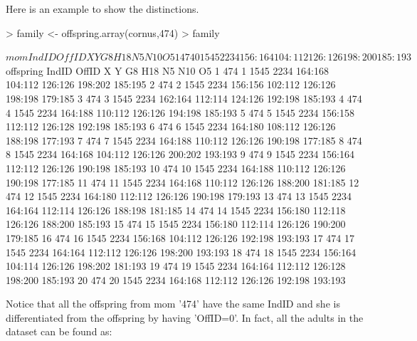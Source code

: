 \documentclass[letterpaper,twoside,openany]{book}
\begin{document}
Here is an example to show the distinctions. 

\begin{Schunk}
\begin{Sinput}
> family <- offspring.array(cornus,474)
> family
\end{Sinput}
\begin{Soutput}
$mom
  IndID OffID    X    Y      G8     H18      N5     N10      O5
1   474     0 1545 2234 156:164 104:112 126:126 198:200 185:193

$offspring
   IndID OffID    X    Y      G8     H18      N5     N10      O5
1    474     1 1545 2234 164:168 104:112 126:126 198:202 185:195
2    474     2 1545 2234 156:156 102:112 126:126 198:198 179:185
3    474     3 1545 2234 162:164 112:114 124:126 192:198 185:193
4    474     4 1545 2234 164:188 110:112 126:126 194:198 185:193
5    474     5 1545 2234 156:158 112:112 126:128 192:198 185:193
6    474     6 1545 2234 164:180 108:112 126:126 188:198 177:193
7    474     7 1545 2234 164:188 110:112 126:126 190:198 177:185
8    474     8 1545 2234 164:168 104:112 126:126 200:202 193:193
9    474     9 1545 2234 156:164 112:112 126:126 190:198 185:193
10   474    10 1545 2234 164:188 110:112 126:126 190:198 177:185
11   474    11 1545 2234 164:168 110:112 126:126 188:200 181:185
12   474    12 1545 2234 164:180 112:112 126:126 190:198 179:193
13   474    13 1545 2234 164:164 112:114 126:126 188:198 181:185
14   474    14 1545 2234 156:180 112:118 126:126 188:200 185:193
15   474    15 1545 2234 156:180 112:114 126:126 190:200 179:185
16   474    16 1545 2234 156:168 104:112 126:126 192:198 193:193
17   474    17 1545 2234 164:164 112:112 126:126 198:200 193:193
18   474    18 1545 2234 156:164 104:114 126:126 198:202 181:193
19   474    19 1545 2234 164:164 112:112 126:128 198:200 185:193
20   474    20 1545 2234 164:168 112:112 126:126 192:198 193:193
\end{Soutput}
\end{Schunk}

Notice that all the offspring from mom '474' have the same IndID and she is differentiated from the offspring by having 'OffID=0'.  In fact, all the adults in the dataset can be found as:
\end{document}
